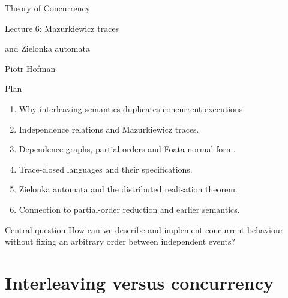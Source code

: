 \documentclass[t,11pt]{beamer}
\begin{document}
\begin{frame}[plain]
  \vspace{1.10cm}
  \begin{center}
    {\huge\color{LectureBlue} Theory of Concurrency\par}
    \vspace{0.55cm}
    {\Large Lecture 6: Mazurkiewicz traces\par}
    \vspace{0.17cm}
    {\Large and Zielonka automata\par}
    \vspace{0.94cm}
    {\large Piotr Hofman\par}
  \end{center}
\end{frame}

\begin{frame}{Plan}
  \begin{enumerate}
    \item Why interleaving semantics duplicates concurrent executions.
    \item Independence relations and Mazurkiewicz traces.
    \item Dependence graphs, partial orders and Foata normal form.
    \item Trace-closed languages and their specifications.
    \item Zielonka automata and the distributed realisation theorem.
    \item Connection to partial-order reduction and earlier semantics.
  \end{enumerate}
  \vspace{0.4cm}
  \begin{block}{Central question}
    How can we describe and implement concurrent behaviour without fixing an arbitrary order between independent events?
  \end{block}
\end{frame}

\section{Interleaving versus concurrency}
\end{document}
